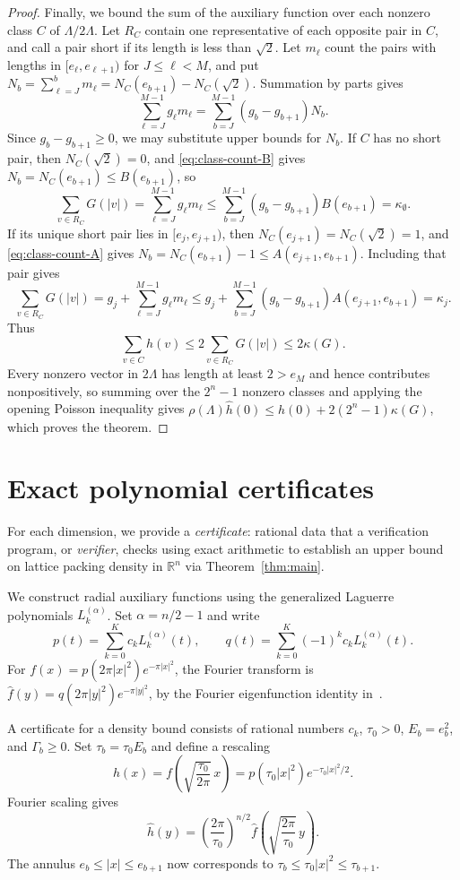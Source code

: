 \documentclass[11pt]{article}
\newcommand{\R}{\mathbb R}
\newcommand{\kap}{\kappa}
\begin{document}
\begin{proof}
Finally, we bound the sum of the auxiliary function over each nonzero
class $C$ of $\Lambda/2\Lambda$. Let $R_C$ contain one representative
of each opposite pair in $C$, and call a pair short if its length is
less than $\sqrt2$. Let $m_\ell$ count the pairs with lengths in
$[e_\ell,e_{\ell+1})$ for $J\le\ell<M$, and put
$N_b=\sum_{\ell=J}^b m_\ell=N_C(e_{b+1})-N_C(\sqrt2)$.
Summation by parts gives
\[
 \sum_{\ell=J}^{M-1}g_\ell m_\ell
 =\sum_{b=J}^{M-1}(g_b-g_{b+1})N_b.
\]
Since $g_b-g_{b+1}\ge0$, we may substitute upper bounds for $N_b$.
If $C$ has no short pair, then $N_C(\sqrt2)=0$, and
\eqref{eq:class-count-B} gives $N_b=N_C(e_{b+1})\le B(e_{b+1})$, so
\[
 \sum_{v\in R_C}G(|v|)
 =\sum_{\ell=J}^{M-1}g_\ell m_\ell
 \le\sum_{b=J}^{M-1}(g_b-g_{b+1})B(e_{b+1})
 =\kap_\emptyset.
\]
If its unique short pair lies in $[e_j,e_{j+1})$, then
$N_C(e_{j+1})=N_C(\sqrt2)=1$, and \eqref{eq:class-count-A} gives
$N_b=N_C(e_{b+1})-1\le A(e_{j+1},e_{b+1})$. Including that pair gives
\[
 \sum_{v\in R_C}G(|v|)
 =g_j+\sum_{\ell=J}^{M-1}g_\ell m_\ell
 \le g_j+\sum_{b=J}^{M-1}(g_b-g_{b+1})A(e_{j+1},e_{b+1})
 =\kap_j.
\]
Thus 
\[
 \sum_{v\in C}h(v) \le2\sum_{v\in R_C}G(|v|)\le2\kap(G).
\]
Every nonzero vector in $2\Lambda$ has length at least $2>e_M$ and hence contributes nonpositively, so summing over the $2^n-1$ nonzero classes and applying the opening Poisson inequality gives $\rho(\Lambda)\widehat h(0)\le h(0)+2(2^n-1)\kap(G)$, which proves the theorem.
\end{proof}



\section{Exact polynomial certificates}\label{sec:certificates}

For each dimension, we provide a \emph{certificate}: rational data that a
verification program, or \emph{verifier}, checks using exact arithmetic
to establish an upper bound on lattice packing density in $\R^n$ via
Theorem~\ref{thm:main}.


We construct radial auxiliary functions using the generalized Laguerre
polynomials $L_k^{(\alpha)}$. Set $\alpha=n/2-1$ and write
\[
 p(t)=\sum_{k=0}^K c_kL_k^{(\alpha)}(t),\qquad
 q(t)=\sum_{k=0}^K(-1)^kc_kL_k^{(\alpha)}(t).
\]
For $f(x)=p(2\pi|x|^2)e^{-\pi|x|^2}$, the Fourier transform is
$\widehat f(y)=q(2\pi|y|^2)e^{-\pi|y|^2}$, by the Fourier
eigenfunction identity in~\cite[Section~7]{CE}.

A certificate for a density bound consists of rational numbers $c_k$, $\tau_0>0$,
$E_b=e_b^2$, and $\Gamma_b\ge0$. Set
$\tau_b=\tau_0E_b$ and define a rescaling
\[
 h(x)=f\left(\sqrt{\frac{\tau_0}{2\pi}}\,x\right)
     =p(\tau_0|x|^2)e^{-\tau_0|x|^2/2}.
\]
Fourier scaling gives
\[
 \widehat h(y)=\left(\frac{2\pi}{\tau_0}\right)^{n/2}
 \widehat f\left(\sqrt{\frac{2\pi}{\tau_0}}\,y\right).
\]
The annulus $e_b\le|x|\le e_{b+1}$ now corresponds to
$\tau_b\le\tau_0|x|^2\le\tau_{b+1}$.
\end{document}
